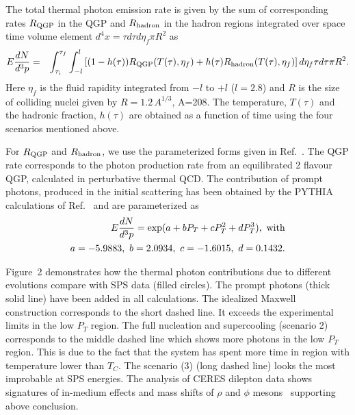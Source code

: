   The total thermal photon emission rate is given by the sum of 
corresponding rates $R_{\rm QGP}$ in the QGP and $R_{\rm hadron}$ 
in the hadron regions integrated over space time volume 
element $d^4x = \tau d\tau d\eta_f \pi R^2$ as
\begin{eqnarray}\label{}
 E \frac{dN}{d^3 p}  &=& \int_{\tau_i}^{\tau_f} \int_{-l}^{l} 
     \left[(1-h(\tau)) R_{\rm QGP}(T(\tau),\eta_f) 
  + h(\tau)  R_{\rm hadron}(T(\tau),\eta_f) \right]d\eta_f \tau d\tau \pi R^2.
\end{eqnarray}
Here $\eta_f$ is the fluid rapidity integrated from 
$-l$ to $+l$ ($l=2.8$) and $R$ is the size of colliding 
nuclei given by $R=1.2\, A^{1/3}$, A=208. 
 The temperature, $T(\tau)$ and the hadronic fraction, $h(\tau)$ are
obtained as a function of time using the four scenarios mentioned above. 

  For $R_{\rm QGP}$ and $R_{\rm hadron}$, we use the parameterized forms
given in Ref.~\cite{THOMA}. The QGP rate corresponds to 
the photon production rate from an equilibrated 2 flavour
QGP, calculated in perturbative thermal QCD.
  The contribution of prompt photons, produced in the initial 
scattering has been obtained by the PYTHIA
calculations of Ref.~\cite{GALLMEISTER} and are parameterized as
\begin{eqnarray}\label{promp}
E \frac{dN}{d^3 p} = \exp(a + bP_T + cP_T^2 + dP_T^3), \,\, {\rm with} \nonumber\\
  a=-5.9883,\,\, b=2.0934,\,\, c=-1.6015,\,\, d=0.1432.
\end{eqnarray}



   Figure~2 demonstrates how the thermal photon contributions due to 
different evolutions compare with SPS data (filled circles). The prompt 
photons (thick solid line) have been added in all calculations.
 The idealized Maxwell construction corresponds to the short dashed line.
It exceeds the experimental limits in the low $P_T$ region.
The full nucleation and supercooling (scenario 2) corresponds to 
the middle dashed line which shows more photons in the low 
$P_T$ region. This is due to the fact that the system has spent more
time in region with temperature lower than $T_C$. 
  The scenario (3) (long dashed line) looks the most improbable at SPS 
energies. The analysis of CERES dilepton data shows signatures of 
in-medium effects and mass shifts of $\rho$ and $\phi$ mesons~\cite{RAPP} 
supporting above conclusion. 

